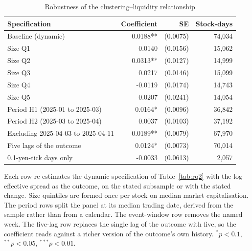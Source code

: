 \begin{table}[htbp]
\centering
\caption{Robustness of the clustering--liquidity relationship}
\label{tab:robust}
\small
\begin{threeparttable}
\begin{tabular}{@{}lrrr@{}}
\toprule
Specification & Coefficient & SE & Stock-days \\
\midrule
Baseline (dynamic) & 0.0188** & (0.0075) & 74,034 \\
Size Q1 & 0.0140 & (0.0156) & 15,062 \\
Size Q2 & 0.0313** & (0.0127) & 14,999 \\
Size Q3 & 0.0217 & (0.0146) & 15,099 \\
Size Q4 & -0.0119 & (0.0174) & 14,743 \\
Size Q5 & 0.0207 & (0.0241) & 14,054 \\
Period H1 (2025-01 to 2025-03) & 0.0164* & (0.0096) & 36,842 \\
Period H2 (2025-03 to 2025-04) & 0.0037 & (0.0103) & 37,192 \\
Excluding 2025-04-03 to 2025-04-11 & 0.0189** & (0.0079) & 67,970 \\
Five lags of the outcome & 0.0124* & (0.0073) & 70,014 \\
0.1-yen-tick days only & -0.0033 & (0.0613) & 2,057 \\
\bottomrule
\end{tabular}
\begin{tablenotes}[flushleft]\footnotesize
\item Each row re-estimates the dynamic specification of Table~\ref{tab:rq2} with the log effective spread as the outcome, on the stated subsample or with the stated change. Size quintiles are formed once per stock on median market capitalisation. The period rows split the panel at its median trading date, derived from the sample rather than from a calendar. The event-window row removes the named week. The five-lag row replaces the single lag of the outcome with five, so the coefficient reads against a richer version of the outcome's own history. $^{*}p<0.1$, $^{**}p<0.05$, $^{***}p<0.01$.
\end{tablenotes}
\end{threeparttable}
\end{table}
